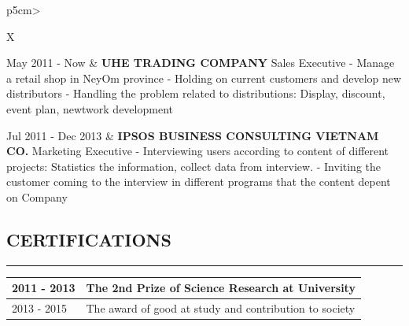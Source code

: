 \documentclass[12pt]{article}
\begin{document}
	\begin{table}[th]
		\vspace*{-0.25cm}
		\renewcommand{\arraystretch}{2}
		\begin{tabularx}{\linewidth}{p{5cm}>{\raggedright\arraybackslash}X}
			May 2011 - Now & \textbf{UHE TRADING COMPANY}\linebreak
							Sales Executive \linebreak
							- Manage a retail shop in NeyOm province \linebreak
							- Holding on current customers and develop new distributors \linebreak
							- Handling the problem related to distributions: Display, discount, event plan, newtwork development \\ \hline
							
			Jul 2011 - Dec 2013 & \textbf{IPSOS BUSINESS CONSULTING VIETNAM CO.}\linebreak
								Marketing Executive \linebreak
								- Interviewing users according to content of different projects: Statistics the information, collect data from interview. \linebreak
								- Inviting the customer coming to the interview in different programs that the content depent on Company \\ \hline
		\end{tabularx}
	\end{table}
	
	
	
	
	\vspace*{-0.5cm}
	\subsection*{CERTIFICATIONS}
	\vspace*{-0.25cm}
	\hrule
	\vspace*{-0.25cm}
	
	\begin{table}[th]
		\vspace*{-0.25cm}
		\renewcommand{\arraystretch}{2}
		\begin{tabularx}{\linewidth}{p{5cm}>{\raggedright\arraybackslash}X}
			2011 - 2013 & The 2nd Prize of Science Research at University \\ \hline
			2013 - 2015 & The award of good at study and contribution to society\\ \hline
		\end{tabularx}
	\end{table}
	
	
	
	
	
	
	
	
	
	
	
	
	
	
	
	
\end{document}

